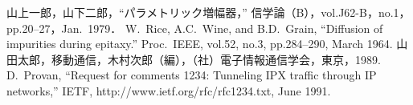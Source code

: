 \documentclass[main]{subfiles}
\begin{document}
\begin{thebibliography}{9}\setlength{\itemsep}{-2pt}

 山上一郎，山下二郎，``パラメトリック増幅器，'' 信学論（B），vol.J62-B，no.1，pp.20--27，Jan.\ 1979．
 W.~Rice, A.C.~Wine, and B.D.~Grain, ``Diffusion of impurities during epitaxy.'' Proc.\ IEEE, vol.52, no.3, pp.284--290, March 1964.
 山田太郎，移動通信，木村次郎（編），（社）電子情報通信学会，東京，1989.
 D.~Provan, ``Request for comments 1234: Tunneling IPX traffic through IP networks,'' IETF, http://www.ietf.org/rfc/rfc1234.txt, June 1991.
\end{thebibliography}
\end{document}
